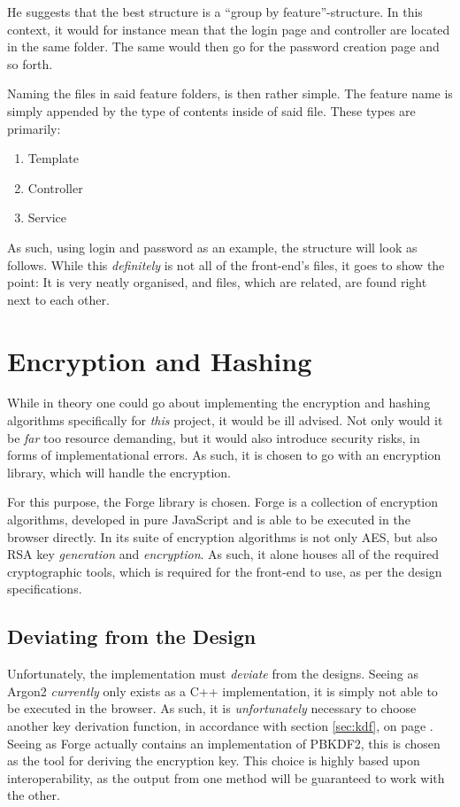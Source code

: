 		He suggests that the best structure is a ``group by feature''-structure. In this context, it would for instance mean that the login page and controller are located in the same folder. The same would then go for the password creation page and so forth.

		Naming the files in said feature folders, is then rather simple. The feature name is simply appended by the type of contents inside of said file. These types are primarily:
		\begin{enumerate}
			\item Template
			\item Controller
			\item Service
		\end{enumerate}
		As such, using login and password as an example, the structure will look as follows. While this \emph{definitely} is not all of the front-end's files, it goes to show the point: It is very neatly organised, and files, which are related, are found right next to each other.


	\section{Encryption and Hashing}
		While in theory one could go about implementing the encryption and hashing algorithms specifically for \emph{this} project, it would be ill advised. Not only would it be \emph{far} too resource demanding, but it would also introduce security risks, in forms of implementational errors. As such, it is chosen to go with an encryption library, which will handle the encryption.

		For this purpose, the Forge library is chosen\cite{forge-encryption}. Forge is a collection of encryption algorithms, developed in pure JavaScript and is able to be executed in the browser directly. In its suite of encryption algorithms is not only AES, but also RSA key \emph{generation} and \emph{encryption}. As such, it alone houses all of the required cryptographic tools, which is required for the front-end to use, as per the design specifications.

		\subsection{Deviating from the Design}
			Unfortunately, the implementation must \emph{deviate} from the designs. Seeing as Argon2 \emph{currently} only exists as a C++ implementation, it is simply not able to be executed in the browser. As such, it is \emph{unfortunately} necessary to choose another key derivation function, in accordance with section \ref{sec:kdf}, on page \pageref{sec:kdf}. Seeing as Forge actually contains an implementation of PBKDF2, this is chosen as the tool for deriving the encryption key. This choice is highly based upon interoperability, as the output from one method will be guaranteed to work with the other.

